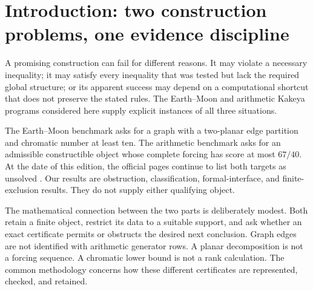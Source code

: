 \documentclass[11pt,letterpaper]{article}
\theoremstyle{definition}
\theoremstyle{remark}\newtheorem{remark}[theorem]{Remark}
\begin{document}
\begin{titlepage}
\begin{abstract}
Connection energy measures subspace changes, but target residues distinguish useful changes from mere rank loss. Source-aware Schur elimination gives an exact coherent-reduction model. A fresh full replay verifies the preserved 481,712-configuration arithmetic census and separate 24,976-graph Earth--Moon family. The parameter families overlap that census and are not added to its counts. Historical Atlas, master-list, manuscript, and Lean scopes are reconciled without identifying their versions or promoting physical analogies to theorems. Neither benchmark construction is obtained.
\end{abstract}
\vfill
{}
\end{titlepage}
\tableofcontents
\newpage
\section{Introduction: two construction problems, one evidence discipline}
A promising construction can fail for different reasons. It may violate a necessary inequality; it may satisfy every inequality that was tested but lack the required global structure; or its apparent success may depend on a computational shortcut that does not preserve the stated rules. The Earth--Moon and arithmetic Kakeya programs considered here supply explicit instances of all three situations.

The Earth--Moon benchmark asks for a graph with a two-planar edge partition and chromatic number at least ten. The arithmetic benchmark asks for an admissible constructible object whose complete forcing has score at most $67/40$. At the date of this edition, the official pages continue to list both targets as unsolved \cite{epochEM,epochAK}. Our results are obstruction, classification, formal-interface, and finite-exclusion results. They do not supply either qualifying object.

The mathematical connection between the two parts is deliberately modest. Both retain a finite object, restrict its data to a suitable support, and ask whether an exact certificate permits or obstructs the desired next conclusion. Graph edges are not identified with arithmetic generator rows. A planar decomposition is not a forcing sequence. A chromatic lower bound is not a rank calculation. The common methodology concerns how these different certificates are represented, checked, and retained.
\end{document}
